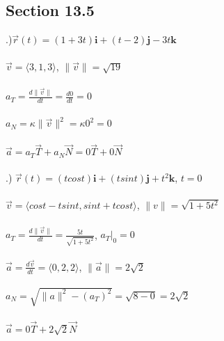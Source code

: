 \documentclass[12pt]{article}
\begin{document}
\subsection*{Section 13.5}
.)$\vec{r}(t) = (1 + 3t)\mathbf{i} + (t - 2)\mathbf{j} - 3t\mathbf{k}$\\\\
\noindent $\vec{v} = \langle 3, 1, 3\rangle$, \hspace{10pt} $\| \vec{v} \| = \sqrt{19}$\\\\
\noindent $a_{T} = \frac{d\|\vec{v} \|}{dt} = \frac{d0}{dt} = 0$\\\\
\noindent $a_{N} = \kappa \| \vec{v} \|^{2} = \kappa 0^{2} = 0$\\\\
\noindent $\vec{a} = a_{T}\vec{T} + a_{N}\vec{N} = 0\vec{T} + 0\vec{N}$\\\\

.) $\vec{r}(t) = (tcos{t})\mathbf{i} + (tsin{t})\mathbf{j} + t^{2}\mathbf{k}$, \hspace{10pt} $t = 0$\\\\
\noindent $\vec{v} = \langle cos{t} - tsin{t}, sin{t} + tcos{t}\rangle$, \hspace{10pt} $\| v\| = \sqrt{1+5t^{2}}$\\\\
\noindent $a_{T} = \frac{d\|\vec{v} \| }{dt} = \frac{5t}{\sqrt{1+5t^{2}}}$, \hspace{10pt} $a_{T}\Big|_{0} = 0$\\\\
\noindent $\vec{a} = \frac{d\vec{v}}{dt} = \langle 0, 2, 2\rangle$, \hspace{10pt} $\| \vec{a}\|  =2\sqrt{2}$\\\\
\noindent $a_{N} = \sqrt{\| a \| ^{2} - (a_{T})^{2}} = \sqrt{8 - 0} = 2\sqrt{2}$\\\\
\noindent $\vec{a} = 0\vec{T} + 2\sqrt{2}\vec{N}$\\\\
\end{document}
